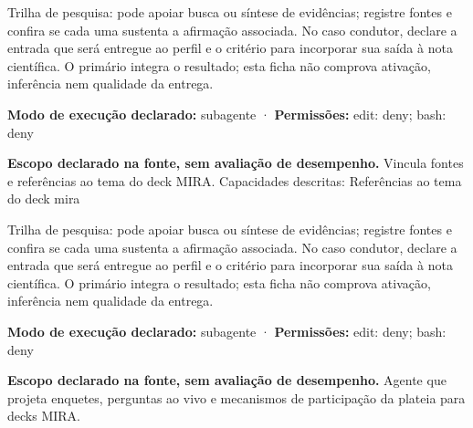 \begin{funcao}
Trilha de pesquisa: pode apoiar busca ou síntese de evidências; registre fontes e confira se cada uma sustenta a afirmação associada. No caso condutor, declare a entrada que será entregue ao perfil e o critério para incorporar sua saída à nota científica. O primário integra o resultado; esta ficha não comprova ativação, inferência nem qualidade da entrega.
\end{funcao}

\begin{arquitetura}
\textbf{Modo de execução declarado:} subagente · \textbf{Permissões:} edit: deny; bash: deny
\end{arquitetura}


\begin{descricao}
\textbf{Escopo declarado na fonte, sem avaliação de desempenho.}
Vincula fontes e referências ao tema do deck MIRA. Capacidades descritas: Referências ao tema do deck mira
\end{descricao}

\begin{funcao}
Trilha de pesquisa: pode apoiar busca ou síntese de evidências; registre fontes e confira se cada uma sustenta a afirmação associada. No caso condutor, declare a entrada que será entregue ao perfil e o critério para incorporar sua saída à nota científica. O primário integra o resultado; esta ficha não comprova ativação, inferência nem qualidade da entrega.
\end{funcao}

\begin{arquitetura}
\textbf{Modo de execução declarado:} subagente · \textbf{Permissões:} edit: deny; bash: deny
\end{arquitetura}


\begin{descricao}
\textbf{Escopo declarado na fonte, sem avaliação de desempenho.}
Agente que projeta enquetes, perguntas ao vivo e mecanismos de participação da plateia para decks MIRA.
\end{descricao}

